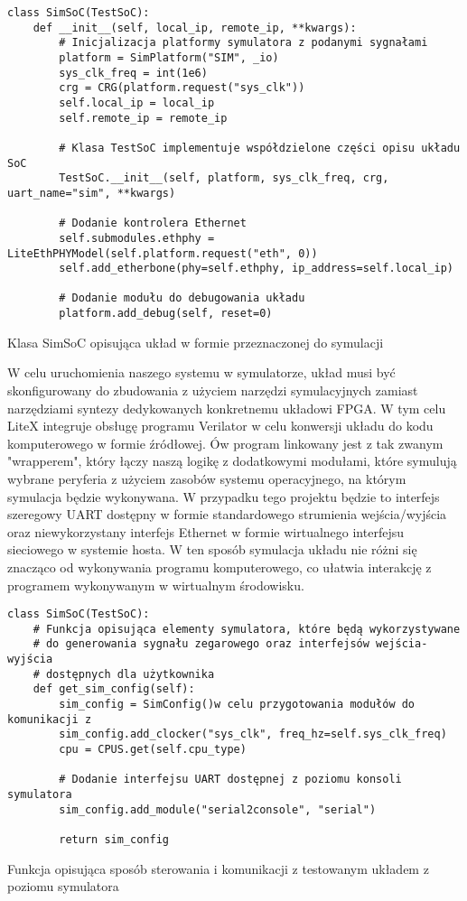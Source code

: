 \begin{listing}[H]
\begin{verbatim}
class SimSoC(TestSoC):
    def __init__(self, local_ip, remote_ip, **kwargs):
        # Inicjalizacja platformy symulatora z podanymi sygnałami
        platform = SimPlatform("SIM", _io)
        sys_clk_freq = int(1e6)
        crg = CRG(platform.request("sys_clk"))
        self.local_ip = local_ip
        self.remote_ip = remote_ip

        # Klasa TestSoC implementuje współdzielone części opisu układu SoC
        TestSoC.__init__(self, platform, sys_clk_freq, crg, uart_name="sim", **kwargs)

        # Dodanie kontrolera Ethernet
        self.submodules.ethphy = LiteEthPHYModel(self.platform.request("eth", 0))
        self.add_etherbone(phy=self.ethphy, ip_address=self.local_ip)

        # Dodanie modułu do debugowania układu
        platform.add_debug(self, reset=0)
\end{verbatim}
\caption{\label{lst:tooling-litex-sim-soc}Klasa SimSoC opisująca układ w formie przeznaczonej do symulacji}
\end{listing}

W celu uruchomienia naszego systemu w symulatorze, układ musi być skonfigurowany do zbudowania z użyciem narzędzi symulacyjnych zamiast narzędziami syntezy dedykowanych konkretnemu układowi FPGA. W tym celu LiteX integruje obsługę programu Verilator\cite{verilator:2016:Online} w celu konwersji układu do kodu komputerowego w formie źródłowej. Ów program linkowany jest z tak zwanym "wrapperem", który łączy naszą logikę z dodatkowymi modułami, które symulują wybrane peryferia z użyciem zasobów systemu operacyjnego, na którym symulacja będzie wykonywana. W przypadku tego projektu będzie to interfejs szeregowy UART dostępny w formie standardowego strumienia wejścia/wyjścia oraz niewykorzystany interfejs Ethernet w formie wirtualnego interfejsu sieciowego w systemie hosta. W ten sposób symulacja układu nie różni się znacząco od wykonywania programu komputerowego, co ułatwia interakcję z programem wykonywanym w wirtualnym środowisku.

\begin{listing}[H]
\begin{verbatim}
class SimSoC(TestSoC):
    # Funkcja opisująca elementy symulatora, które będą wykorzystywane
    # do generowania sygnału zegarowego oraz interfejsów wejścia-wyjścia
    # dostępnych dla użytkownika
    def get_sim_config(self):
        sim_config = SimConfig()w celu przygotowania modułów do komunikacji z
        sim_config.add_clocker("sys_clk", freq_hz=self.sys_clk_freq)
        cpu = CPUS.get(self.cpu_type)

        # Dodanie interfejsu UART dostępnej z poziomu konsoli symulatora
        sim_config.add_module("serial2console", "serial")

        return sim_config
\end{verbatim}
\caption{\label{lst:tooling-litex-sim-config}Funkcja opisująca sposób sterowania i komunikacji z testowanym układem z poziomu symulatora}
\end{listing}

